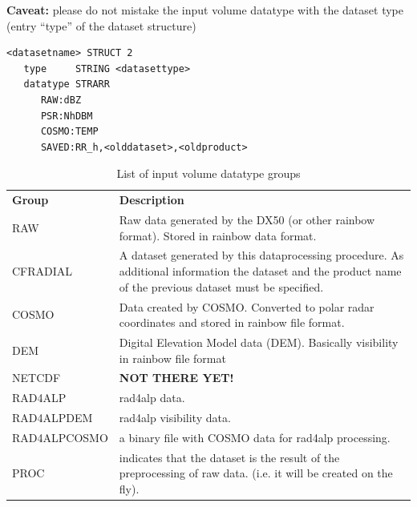 \documentclass[a4paper,11pt,pdftex,twoside]{scrartcl}
\renewcommand{\bf}{\normalfont \bfseries}
\begin{document}
{{{\noindent
{\bf Caveat:} please do not mistake the input volume datatype with the dataset type (entry  ``type'' of the dataset structure)
\begin{verbatim}
<datasetname> STRUCT 2
   type     STRING <datasettype>
   datatype STRARR
      RAW:dBZ
      PSR:NhDBM
      COSMO:TEMP
      SAVED:RR_h,<olddataset>,<oldproduct>
\end{verbatim}

\begin{table}[H]
\begin{tabularx}{\textwidth}{lX}
\bf{Group} & \bf{Description}\\
RAW       & Raw data generated by the DX50 (or other rainbow format). Stored in rainbow data format.\\
CFRADIAL     & A dataset generated by this dataprocessing procedure. As additional
            information the dataset and the product name of the previous dataset
            must be specified.\\
COSMO     & Data created by COSMO. Converted to polar radar coordinates and
            stored in rainbow file format.\\
DEM     & Digital Elevation Model data (DEM). Basically visibility in rainbow file format\\
NETCDF    & {\bf NOT THERE YET!} \\

RAD4ALP & rad4alp data.\\
RAD4ALPDEM & rad4alp visibility data.\\
RAD4ALPCOSMO & a binary file with COSMO data for rad4alp processing.\\
PROC & indicates that the dataset is the result of the preprocessing of raw data. (i.e. it will be created on the fly).\\

\end{tabularx}
\caption{List of input volume datatype groups}
\label{tab_datatype_groups}
\end{table}


}}}
\end{document}
